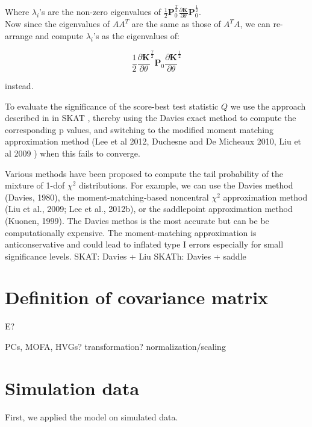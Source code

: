 Where $\lambda_i$'s are the non-zero eigenvalues of $\frac{1}{2}\mathbf{P}_0^{\frac{T}{2}} \frac{\partial\mathbf{K}}{\partial \theta} \mathbf{P}_0^{\frac{1}{2}}$.\\

Now since the eigenvalues of $AA^T$ are the same as those of $A^TA$, we can re-arrange and compute $\lambda_i$'s as the eigenvalues of:

\begin{equation}
    \frac{1}{2}\frac{\partial\mathbf{K}}{\partial \theta}^{\frac{T}{2}} \mathbf{P}_0 \frac{\partial\mathbf{K}}{\partial \theta}^{\frac{1}{2}}
\end{equation}

instead.

To evaluate the significance of the score-best test statistic $Q$ we use the approach described in in SKAT \cite{wu2011rare}, thereby using the Davies exact method \cite{davies1980algorithm} to compute the corresponding p values, and switching to the modified moment matching approximation method (Lee et al 2012, Duchesne and De Micheaux 2010, Liu et al 2009 \cite{liu2009new, lee2012optimal}) when this fails to converge.


Various methods have been proposed to compute the tail probability of the mixture of 1-dof $\chi^2$ distributions. 
For example, we can use the Davies method (Davies, 1980)\cite{davies1980algorithm}, the moment‐matching‐based noncentral $\chi^2$ approximation method \cite{liu2009new, lee2012optimal}(Liu et al., 2009; Lee et al., 2012b), or the saddlepoint approximation method (Kuonen, 1999). 
The Davies methos is the most accurate but can be be computationally expensive.
The moment-matching approximation is anticonservative and could lead to inflated type I errors especially for small significance levels.
SKAT: Davies + Liu
SKATh: Davies + saddle
\cite{wu2016efficient}

\section{Definition of covariance matrix}

E?

PCs, MOFA, HVGs?
transformation?
normalization/scaling


\section{Simulation data}

First, we applied the model on simulated data.

